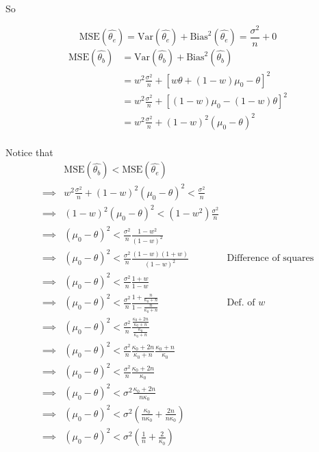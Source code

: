 \documentclass[]{article}
\begin{document}
So

\[\text{MSE}(\hat{\theta_e}) = \text{Var}(\hat{\theta_e}) + \text{Bias}^2(\hat{\theta_e}) = \frac{\sigma^2}{n} + 0\]
\begin{align}
\text{MSE}(\hat{\theta_b}) &= \text{Var}(\hat{\theta_b}) + \text{Bias}^2(\hat{\theta_b}) \\
&= w^2 \frac{\sigma^2}{n} + \left[ w\theta + (1 - w)\mu_0 - \theta \right]^2 \\
&= w^2 \frac{\sigma^2}{n} + \left[ (1 - w)\mu_0 - (1 - w)\theta \right]^2 \\
&= w^2 \frac{\sigma^2}{n} + (1 - w)^2(\mu_0 - \theta)^2 \\
\end{align}

Notice that \begin{align}
& \text{MSE}(\hat{\theta_b}) < \text{MSE}(\hat{\theta_e}) \\
\implies& w^2 \frac{\sigma^2}{n} + (1 - w)^2 (\mu_0 - \theta)^2 < \frac{\sigma^2}{n} \\
\implies& (1-w)^2(\mu_0 - \theta)^2 < (1 - w^2) \frac{\sigma^2}{n} \\
\implies& (\mu_0 - \theta)^2 < \frac{\sigma^2}{n} \frac{1-w^2}{(1 - w)^2} \\
\implies& (\mu_0 - \theta)^2 < \frac{\sigma^2}{n} \frac{(1 - w)(1 + w)}{(1 - w)^2} & \text{Difference of squares} \\
\implies& (\mu_0 - \theta)^2 < \frac{\sigma^2}{n} \frac{1 + w}{1 - w} \\
\implies& (\mu_0 - \theta)^2 < \frac{\sigma^2}{n} \frac{1 + \frac{n}{\kappa_0 + n}}{1 - \frac{n}{\kappa_0 + n}} & \text{Def. of $w$} \\
\implies& (\mu_0 - \theta)^2 < \frac{\sigma^2}{n} \frac{\frac{\kappa_0 + 2n}{\kappa_0 + n}}{\frac{\kappa_0}{\kappa_0 + n}} \\
\implies& (\mu_0 - \theta)^2 < \frac{\sigma^2}{n} \frac{\kappa_0 + 2n}{\kappa_0 + n}\frac{\kappa_0 + n}{\kappa_0} \\
\implies& (\mu_0 - \theta)^2 < \frac{\sigma^2}{n} \frac{\kappa_0 + 2n}{\kappa_0} \\
\implies& (\mu_0 - \theta)^2 < \sigma^2 \frac{\kappa_0 + 2n}{n\kappa_0} \\
\implies& (\mu_0 - \theta)^2 < \sigma^2 \left( \frac{\kappa_0}{n\kappa_0} + \frac{2n}{n\kappa_0} \right) \\
\implies& (\mu_0 - \theta)^2 < \sigma^2 \left( \frac{1}{n} + \frac{2}{\kappa_0} \right) \\
\end{align}
\end{document}
